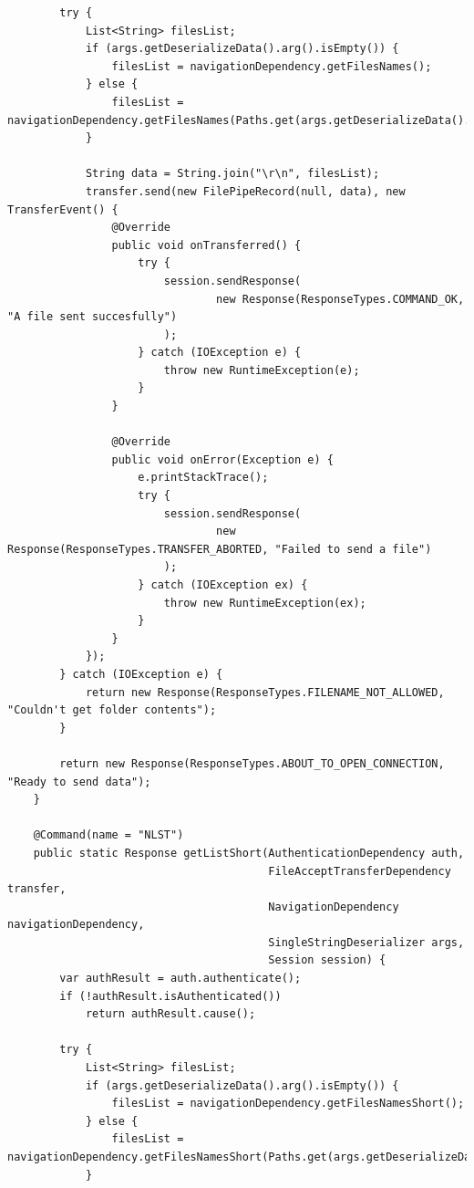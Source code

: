 \documentclass[a4paper,14pt]{extarticle}
\begin{document}
\begin{verbatim}
        try {
            List<String> filesList;
            if (args.getDeserializeData().arg().isEmpty()) {
                filesList = navigationDependency.getFilesNames();
            } else {
                filesList = navigationDependency.getFilesNames(Paths.get(args.getDeserializeData().arg()));
            }

            String data = String.join("\r\n", filesList);
            transfer.send(new FilePipeRecord(null, data), new TransferEvent() {
                @Override
                public void onTransferred() {
                    try {
                        session.sendResponse(
                                new Response(ResponseTypes.COMMAND_OK, "A file sent succesfully")
                        );
                    } catch (IOException e) {
                        throw new RuntimeException(e);
                    }
                }

                @Override
                public void onError(Exception e) {
                    e.printStackTrace();
                    try {
                        session.sendResponse(
                                new Response(ResponseTypes.TRANSFER_ABORTED, "Failed to send a file")
                        );
                    } catch (IOException ex) {
                        throw new RuntimeException(ex);
                    }
                }
            });
        } catch (IOException e) {
            return new Response(ResponseTypes.FILENAME_NOT_ALLOWED, "Couldn't get folder contents");
        }

        return new Response(ResponseTypes.ABOUT_TO_OPEN_CONNECTION, "Ready to send data");
    }

    @Command(name = "NLST")
    public static Response getListShort(AuthenticationDependency auth,
                                        FileAcceptTransferDependency transfer,
                                        NavigationDependency navigationDependency,
                                        SingleStringDeserializer args,
                                        Session session) {
        var authResult = auth.authenticate();
        if (!authResult.isAuthenticated())
            return authResult.cause();

        try {
            List<String> filesList;
            if (args.getDeserializeData().arg().isEmpty()) {
                filesList = navigationDependency.getFilesNamesShort();
            } else {
                filesList = navigationDependency.getFilesNamesShort(Paths.get(args.getDeserializeData().arg()));
            }


\end{verbatim}
\end{document}
